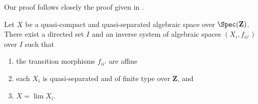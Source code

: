 %

\begin{proposition}
\label{proposition-approximate}
\begin{reference}
Our proof follows closely the proof given in \cite[Theorem 1.2.2]{CLO}.
\end{reference}
Let $X$ be a quasi-compact and quasi-separated algebraic space over
$\Spec(\mathbf{Z})$. There exist a directed set $I$
and an inverse system of algebraic spaces $(X_i, f_{ii'})$ over $I$
such that
\begin{enumerate}
\item the transition morphisms $f_{ii'}$ are affine
\item each $X_i$ is quasi-separated and of finite type over
$\mathbf{Z}$, and
\item $X = \lim X_i$.
\end{enumerate}
\end{proposition}

